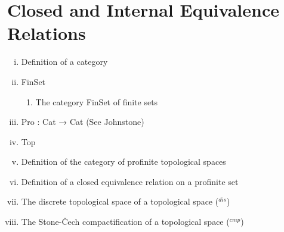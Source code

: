 \documentclass[13pt]{amsart}
\begin{document}
\section{}



\section{Closed and Internal Equivalence Relations}

\begin{enumerate}[(i)]
\item Definition of a category
\item FinSet
\begin{enumerate}
\item The category FinSet of finite sets 
\end{enumerate}
\item Pro : Cat → Cat (See Johnstone)
\item Top \iffalse
\item Definition of a cofiltered diagram
\item Definition of a cofiltered limit on objects
\item Definition the category Pro C for a category C
\item The product of profinite sets is profinite and satisfies the universal property of product in profinite sets.
\item Definition of a $\texttt{Pro FinSet}$
\item Definition of a $\texttt{CH}$ the category of compact hausdorff topological spaces, a fully faithful subcategory of topological spaces  \fi
\item Definition of the category of profinite topological spaces
\item Definition of a closed equivalence relation on a profinite set
\item The discrete topological space of a topological space (${}^{dis}$)
\item The Stone-Čech compactification of a topological space (${}^{cmp}$)
\end{enumerate}

    
\end{document}
